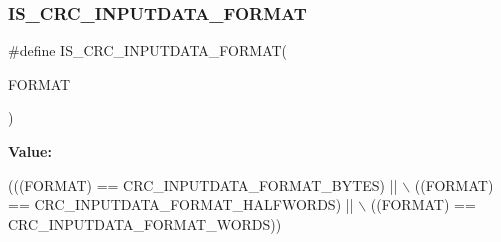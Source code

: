 \subsubsection{\texorpdfstring{I\+S\+\_\+\+C\+R\+C\+\_\+\+I\+N\+P\+U\+T\+D\+A\+T\+A\+\_\+\+F\+O\+R\+M\+AT}{IS\_CRC\_INPUTDATA\_FORMAT}}
{\footnotesize\ttfamily \#define I\+S\+\_\+\+C\+R\+C\+\_\+\+I\+N\+P\+U\+T\+D\+A\+T\+A\+\_\+\+F\+O\+R\+M\+AT(\begin{DoxyParamCaption}\item[{}]{F\+O\+R\+M\+AT }\end{DoxyParamCaption})}

{\bfseries Value\+:}
\begin{DoxyCode}
(((FORMAT) == CRC\_INPUTDATA\_FORMAT\_BYTES) || \(\backslash\)
                                                   ((FORMAT) == CRC\_INPUTDATA\_FORMAT\_HALFWORDS) || \(\backslash\)
                                                   ((FORMAT) == CRC\_INPUTDATA\_FORMAT\_WORDS))
\end{DoxyCode}
